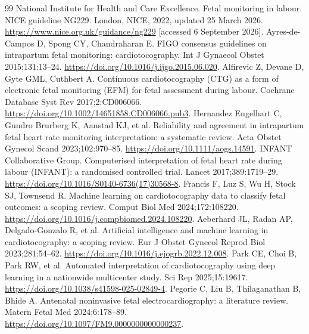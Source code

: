 \begin{thebibliography}{99}
 National Institute for Health and Care Excellence. Fetal monitoring in labour. NICE guideline NG229. London, NICE, 2022, updated 25 March 2026. \url{https://www.nice.org.uk/guidance/ng229} [accessed 6 September 2026].
 Ayres-de-Campos D, Spong CY, Chandraharan E. FIGO consensus guidelines on intrapartum fetal monitoring: cardiotocography. Int J Gynaecol Obstet 2015;131:13--24. \href{https://doi.org/10.1016/j.ijgo.2015.06.020}{https://doi.org/10.1016/j.ijgo.2015.06.020}.
 Alfirevic Z, Devane D, Gyte GML, Cuthbert A. Continuous cardiotocography (CTG) as a form of electronic fetal monitoring (EFM) for fetal assessment during labour. Cochrane Database Syst Rev 2017;2:CD006066. \href{https://doi.org/10.1002/14651858.CD006066.pub3}{https://doi.org/10.1002/14651858.CD006066.pub3}.
 Hernandez Engelhart C, Gundro Brurberg K, Aanstad KJ, et al. Reliability and agreement in intrapartum fetal heart rate monitoring interpretation: a systematic review. Acta Obstet Gynecol Scand 2023;102:970--85. \href{https://doi.org/10.1111/aogs.14591}{https://doi.org/10.1111/aogs.14591}.
 INFANT Collaborative Group. Computerised interpretation of fetal heart rate during labour (INFANT): a randomised controlled trial. Lancet 2017;389:1719--29. \href{https://doi.org/10.1016/S0140-6736(17)30568-8}{https://doi.org/10.1016/S0140-6736(17)30568-8}.
 Francis F, Luz S, Wu H, Stock SJ, Townsend R. Machine learning on cardiotocography data to classify fetal outcomes: a scoping review. Comput Biol Med 2024;172:108220. \href{https://doi.org/10.1016/j.compbiomed.2024.108220}{https://doi.org/10.1016/j.compbiomed.2024.108220}.
 Aeberhard JL, Radan AP, Delgado-Gonzalo R, et al. Artificial intelligence and machine learning in cardiotocography: a scoping review. Eur J Obstet Gynecol Reprod Biol 2023;281:54--62. \href{https://doi.org/10.1016/j.ejogrb.2022.12.008}{https://doi.org/10.1016/j.ejogrb.2022.12.008}.
 Park CE, Choi B, Park RW, et al. Automated interpretation of cardiotocography using deep learning in a nationwide multicenter study. Sci Rep 2025;15:19617. \href{https://doi.org/10.1038/s41598-025-02849-4}{https://doi.org/10.1038/s41598-025-02849-4}.
 Pegorie C, Liu B, Thilaganathan B, Bhide A. Antenatal noninvasive fetal electrocardiography: a literature review. Matern Fetal Med 2024;6:178--89. \href{https://doi.org/10.1097/FM9.0000000000000237}{https://doi.org/10.1097/FM9.0000000000000237}.

\end{thebibliography}
